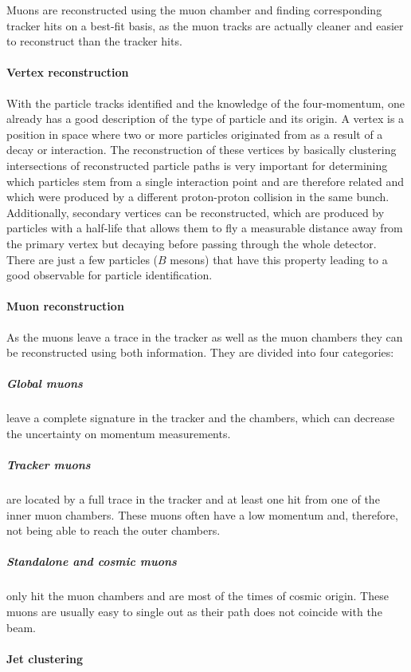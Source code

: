 Muons are reconstructed using the muon chamber and finding corresponding tracker hits on a best-fit basis, as the muon tracks are actually cleaner and easier to reconstruct than the tracker hits.~\cite{like-bf36}

\paragraph{Vertex reconstruction}

With the particle tracks identified and the knowledge of the four-momentum, one already has a good description of the type of particle and its origin. A vertex is a position in space where two or more particles originated from as a result of a decay or interaction. The reconstruction of these vertices by basically clustering intersections of reconstructed particle paths is very important for determining which particles stem from a single interaction point and are therefore related and which were produced by a different proton-proton collision in the same bunch. Additionally, secondary vertices can be reconstructed, which are produced by particles with a half-life that allows them to fly a measurable distance away from the primary vertex but decaying before passing through the whole detector. There are just a few particles (\(B\) mesons) that have this property leading to a good observable for particle identification.~\cite{like-bf36}

\paragraph{Muon reconstruction}

As the muons leave a trace in the tracker as well as the muon chambers they can be reconstructed using both information. They are divided into four categories:
\subparagraph{Global muons} leave a complete signature in the tracker and the chambers, which can decrease the uncertainty on momentum measurements.
\subparagraph{Tracker muons} are located by a full trace in the tracker and at least one hit from one of the inner muon chambers. These muons often have a low momentum and, therefore, not being able to reach the outer chambers.
\subparagraph{Standalone and cosmic muons} only hit the muon chambers and are most of the times of cosmic origin. These muons are usually easy to single out as their path does not coincide with the beam.~\cite{like-bf41,like-bf42}

\paragraph{Jet clustering}

